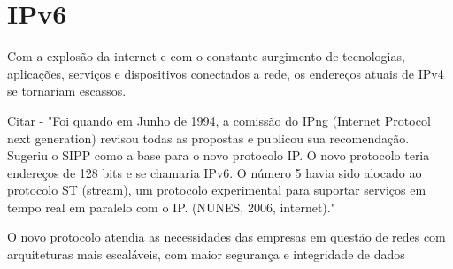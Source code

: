 \section{IPv6}\label{sec:protIPv6}

Com a explosão da internet e com o constante surgimento de tecnologias, aplicações, serviços e dispositivos conectados a rede, os endereços atuais de IPv4 se tornariam escassos. 

Citar - "Foi quando em Junho de 1994, a comissão do IPng (Internet Protocol next generation) revisou todas as propostas e publicou sua recomendação. Sugeriu o SIPP como a base para o novo protocolo IP. O novo protocolo teria endereços de 128 bits e se chamaria IPv6. O número 5 havia sido alocado ao protocolo ST (stream), um protocolo experimental para suportar serviços em tempo real em paralelo com o IP. (NUNES, 2006, internet)."

O novo protocolo atendia as necessidades das empresas em questão de redes com arquiteturas mais escaláveis, com maior segurança e integridade de dados 